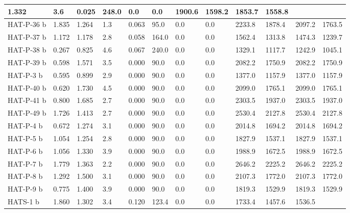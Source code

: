 \documentclass[letterpaper,10pt,english]{sphinxmanual}
\begin{document}
\begin{longtable}{|l|l|l|l|l|l|l|l|l|l|l|l|}
1.332
 & 
3.6
 & 
0.025
 & 
248.0
 & 
0.0
 & 
0.0
 & 
1900.6
 & 
1598.2
 & 
1853.7
 & 
1558.8
\\
\hline
HAT-P-36 b
 & 
1.835
 & 
1.264
 & 
1.3
 & 
0.063
 & 
95.0
 & 
0.0
 & 
0.0
 & 
2233.8
 & 
1878.4
 & 
2097.2
 & 
1763.5
\\
\hline
HAT-P-37 b
 & 
1.172
 & 
1.178
 & 
2.8
 & 
0.058
 & 
164.0
 & 
0.0
 & 
0.0
 & 
1562.4
 & 
1313.8
 & 
1474.3
 & 
1239.7
\\
\hline
HAT-P-38 b
 & 
0.267
 & 
0.825
 & 
4.6
 & 
0.067
 & 
240.0
 & 
0.0
 & 
0.0
 & 
1329.1
 & 
1117.7
 & 
1242.9
 & 
1045.1
\\
\hline
HAT-P-39 b
 & 
0.598
 & 
1.571
 & 
3.5
 & 
0.000
 & 
90.0
 & 
0.0
 & 
0.0
 & 
2082.2
 & 
1750.9
 & 
2082.2
 & 
1750.9
\\
\hline
HAT-P-3 b
 & 
0.595
 & 
0.899
 & 
2.9
 & 
0.000
 & 
90.0
 & 
0.0
 & 
0.0
 & 
1377.0
 & 
1157.9
 & 
1377.0
 & 
1157.9
\\
\hline
HAT-P-40 b
 & 
0.620
 & 
1.730
 & 
4.5
 & 
0.000
 & 
90.0
 & 
0.0
 & 
0.0
 & 
2099.0
 & 
1765.1
 & 
2099.0
 & 
1765.1
\\
\hline
HAT-P-41 b
 & 
0.800
 & 
1.685
 & 
2.7
 & 
0.000
 & 
90.0
 & 
0.0
 & 
0.0
 & 
2303.5
 & 
1937.0
 & 
2303.5
 & 
1937.0
\\
\hline
HAT-P-49 b
 & 
1.726
 & 
1.413
 & 
2.7
 & 
0.000
 & 
90.0
 & 
0.0
 & 
0.0
 & 
2530.4
 & 
2127.8
 & 
2530.4
 & 
2127.8
\\
\hline
HAT-P-4 b
 & 
0.672
 & 
1.274
 & 
3.1
 & 
0.000
 & 
90.0
 & 
0.0
 & 
0.0
 & 
2014.8
 & 
1694.2
 & 
2014.8
 & 
1694.2
\\
\hline
HAT-P-5 b
 & 
1.054
 & 
1.254
 & 
2.8
 & 
0.000
 & 
90.0
 & 
0.0
 & 
0.0
 & 
1827.9
 & 
1537.1
 & 
1827.9
 & 
1537.1
\\
\hline
HAT-P-6 b
 & 
1.056
 & 
1.330
 & 
3.9
 & 
0.000
 & 
90.0
 & 
0.0
 & 
0.0
 & 
1988.9
 & 
1672.5
 & 
1988.9
 & 
1672.5
\\
\hline
HAT-P-7 b
 & 
1.779
 & 
1.363
 & 
2.2
 & 
0.000
 & 
90.0
 & 
0.0
 & 
0.0
 & 
2646.2
 & 
2225.2
 & 
2646.2
 & 
2225.2
\\
\hline
HAT-P-8 b
 & 
1.292
 & 
1.500
 & 
3.1
 & 
0.000
 & 
90.0
 & 
0.0
 & 
0.0
 & 
2107.3
 & 
1772.0
 & 
2107.3
 & 
1772.0
\\
\hline
HAT-P-9 b
 & 
0.775
 & 
1.400
 & 
3.9
 & 
0.000
 & 
90.0
 & 
0.0
 & 
0.0
 & 
1819.3
 & 
1529.9
 & 
1819.3
 & 
1529.9
\\
\hline
HATS-1 b
 & 
1.860
 & 
1.302
 & 
3.4
 & 
0.120
 & 
123.4
 & 
0.0
 & 
0.0
 & 
1733.4
 & 
1457.6
 & 
1536.5
 & 

\end{longtable}
\end{document}
